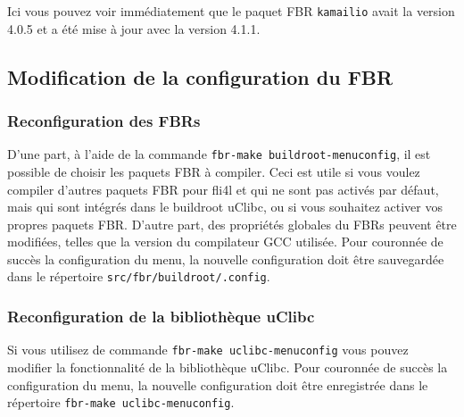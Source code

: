 Ici vous pouvez voir immédiatement que le paquet FBR \texttt{kamailio} avait
la version 4.0.5 et a été mise à jour avec la version 4.1.1.

\subsection{Modification de la configuration du FBR}

\subsubsection{Reconfiguration des FBRs}

D'une part, à l'aide de la commande \texttt{fbr-make buildroot-menuconfig}, il
est possible de choisir les paquets FBR à compiler. Ceci est utile si vous voulez
compiler d'autres paquets FBR pour fli4l et qui ne sont pas activés par défaut,
mais qui sont intégrés dans le buildroot uClibc, ou si vous souhaitez activer
vos propres paquets FBR. D'autre part, des propriétés globales du FBRs peuvent
être modifiées, telles que la version du compilateur GCC utilisée. Pour couronnée
de succès la configuration du menu, la nouvelle configuration doit être sauvegardée
dans le répertoire \texttt{src/fbr/buildroot/.config}.


\subsubsection{Reconfiguration de la bibliothèque uClibc}

Si vous utilisez de commande \texttt{fbr-make uclibc-menuconfig} vous pouvez
modifier la fonctionnalité de la bibliothèque uClibc. Pour couronnée de succès
la configuration du menu, la nouvelle configuration doit être enregistrée dans
le répertoire \texttt{fbr-make uclibc-menuconfig}.


